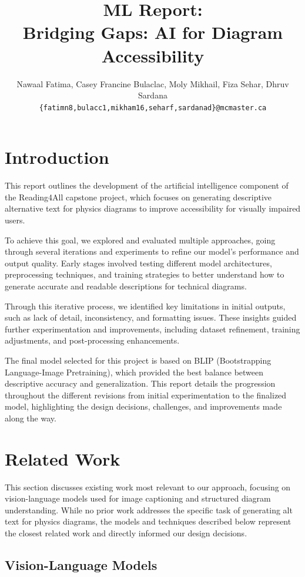 \documentclass[11pt]{article}
\title{ML Report:\\Bridging Gaps: AI for Diagram Accessibility}
\author{Nawaal Fatima, Casey Francine Bulaclac, Moly Mikhail, Fiza Sehar, Dhruv Sardana \\
  \texttt{\{fatimn8,bulacc1,mikham16,seharf,sardanad\}@mcmaster.ca} }
\begin{document}
\maketitle

\section{Introduction}
This report outlines the development of the artificial intelligence component of the Reading4All capstone project, which focuses on generating descriptive alternative text for physics diagrams to 
improve accessibility for visually impaired users.

To achieve this goal, we explored and evaluated multiple approaches, going through several iterations and experiments to refine our model's performance and output quality. Early stages involved 
testing different model architectures, preprocessing techniques, and training strategies to better understand how to generate accurate and readable descriptions for technical diagrams.

Through this iterative process, we identified key limitations in initial outputs, such as lack of detail, inconsistency, and formatting issues. These insights guided further experimentation 
and improvements, including dataset refinement, training adjustments, and post-processing enhancements.

The final model selected for this project is based on BLIP (Bootstrapping Language-Image Pretraining), which provided the best balance between descriptive accuracy and generalization. 
This report details the progression throughout the different revisions from initial experimentation to the finalized model, highlighting the design decisions, challenges, and improvements made along the way.

\section{Related Work}

This section discusses existing work most relevant to our approach, focusing on vision-language models used for image captioning and structured diagram understanding. While no prior work addresses the specific task of generating alt text for physics diagrams, the models and techniques described below represent the closest related work and directly informed our design decisions.

\subsection{Vision-Language Models}
\end{document}
